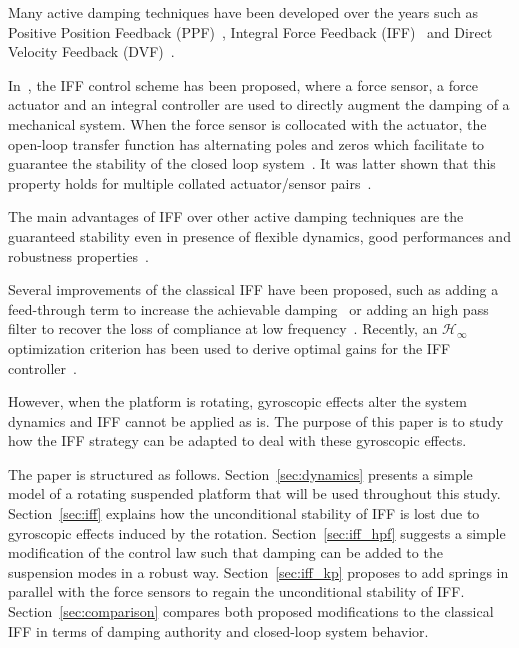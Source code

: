 \documentclass[10pt]{iopart}
\begin{document}
Many active damping techniques have been developed over the years such as Positive Position Feedback (PPF)~\cite{lin06_distur_atten_precis_hexap_point,fanson90_posit_posit_feedb_contr_large_space_struc}, Integral Force Feedback (IFF)~\cite{preumont91_activ} and Direct Velocity Feedback (DVF)~\cite{karnopp74_vibrat_contr_using_semi_activ_force_gener,serrand00_multic_feedb_contr_isolat_base_excit_vibrat,preumont02_force_feedb_versus_accel_feedb}. \par
In~\cite{preumont92_activ_dampin_by_local_force}, the IFF control scheme has been proposed, where a force sensor, a force actuator and an integral controller are used to directly augment the damping of a mechanical system.
When the force sensor is collocated with the actuator, the open-loop transfer function has alternating poles and zeros which facilitate to guarantee the stability of the closed loop system~\cite{preumont02_force_feedb_versus_accel_feedb}.
It was latter shown that this property holds for multiple collated actuator/sensor pairs~\cite{preumont08_trans_zeros_struc_contr_with}. \par
The main advantages of IFF over other active damping techniques are the guaranteed stability even in presence of flexible dynamics, good performances and robustness properties~\cite{preumont02_force_feedb_versus_accel_feedb}. \par
Several improvements of the classical IFF have been proposed, such as adding a feed-through term to increase the achievable damping~\cite{teo15_optim_integ_force_feedb_activ_vibrat_contr} or adding an high pass filter to recover the loss of compliance at low frequency~\cite{chesne16_enhan_dampin_flexib_struc_using_force_feedb}.
Recently, an \(\mathcal{H}_\infty\) optimization criterion has been used to derive optimal gains for the IFF controller~\cite{zhao19_optim_integ_force_feedb_contr}. \par
However, when the platform is rotating, gyroscopic effects alter the system dynamics and IFF cannot be applied as is.
The purpose of this paper is to study how the IFF strategy can be adapted to deal with these gyroscopic effects. \par
The paper is structured as follows.
Section~\ref{sec:dynamics} presents a simple model of a rotating suspended platform that will be used throughout this study.
Section~\ref{sec:iff} explains how the unconditional stability of IFF is lost due to gyroscopic effects induced by the rotation.
Section~\ref{sec:iff_hpf} suggests a simple modification of the control law such that damping can be added to the suspension modes in a robust way.
Section~\ref{sec:iff_kp} proposes to add springs in parallel with the force sensors to regain the unconditional stability of IFF.
Section~\ref{sec:comparison} compares both proposed modifications to the classical IFF in terms of damping authority and closed-loop system behavior.
\end{document}
